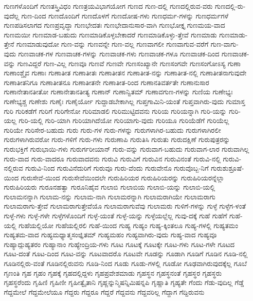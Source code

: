 {ಗುಣಗಳೊಂದಿಗೆ
ಗುಣತಸ್ತ್ರಿವಿಧಂ
ಗುಣತ್ರಯವಿಭಾಗಯೋಗ
ಗುಣದ
ಗುಣ-ದಲ್ಲಿ
ಗುಣದಲ್ಲಿರುವ-ವರು
ಗುಣದಲ್ಲಿ-ರು-ವುದೆಲ್ಲ
ಗುಣ-ದಿಂದ
ಗುಣದೊಂದಿಗೆ
ಗುಣದೊಳಗೆ
ಗುಣದೋಷ-ಗಳು
ಗುಣಧರ್ಮ-ಗಳನ್ನು
ಗುಣಧರ್ಮಗಳೆ
ಗುಣಪಡಿಸಲಾಗದ
ಗುಣಪ್ರವೃದ್ಧಾ
ಗುಣಭೇದತಃ
ಗುಣಭೇದಾನುಸಾರ-ವಾಗಿ
ಗುಣಭೋಕ್ತೃ
ಗುಣಮಯ-ವಾದ
ಗುಣಮಯೀ
ಗುಣಮಾಡ-ಬಹುದು
ಗುಣಮಾಡಿಕೊಳ್ಳಬೇಕಾದರೆ
ಗುಣಮಾಡಿಕೊಳ್ಳು-ತ್ತೇವೆ
ಗುಣಮಾಡು
ಗುಣಮಾಡು-ತ್ತೇನೆ
ಗುಣಮಾಡುವುದೋ
ಗುಣ-ವನ್ನು
ಗುಣವನ್ನೇ
ಗುಣ-ವಲ್ಲ
ಗುಣವಾಗಲೀ
ಗುಣವಾಗುವ-ವರೆಗೆ
ಗುಣ-ವಾಗು-ವುದು
ಗುಣವಾಚಕ-ಗಳ
ಗುಣವಾಚಕ-ಗಳನ್ನು
ಗುಣವಾಚಕ-ಗಳು
ಗುಣವಾಚಕ-ಗಳೂ
ಗುಣವಾಚಕ-ದಿಂದ
ಗುಣವಾಚಕ-ವನ್ನು
ಗುಣವಿದ್ದರೆ
ಗುಣ-ವಿಲ್ಲ
ಗುಣವೂ
ಗುಣವೆ
ಗುಣವೇ
ಗುಣಸಂಖ್ಯಾನೇ
ಗುಣಸಂಗವೇ
ಗುಣಸಂಗೋಽಸ್ಯ
ಗುಣಾ
ಗುಣಾಂಶ್ಚೈವ
ಗುಣಾಃ
ಗುಣಾತೀತ
ಗುಣಾತೀತಃ
ಗುಣಾತೀತನ
ಗುಣಾತೀತ-ನನ್ನು
ಗುಣಾತೀತ-ನಲ್ಲಿ
ಗುಣಾತೀತನಾಗುವುದೇ
ಗುಣಾತೀತನಿಗೂ
ಗುಣಾತೀತನೂ
ಗುಣಾತೀತನೇ
ಗುಣಾತೀತ-ರಿಂದ
ಗುಣಾನತಿವರ್ತತೇ
ಗುಣಾನುಸಾರ
ಗುಣಾನೇತಾನತೀತೋ
ಗುಣಾನೇತಾನತೀತ್ಯ
ಗುಣಾನ್
ಗುಣಾನ್ವಿತಮ್
ಗುಣಾವಗುಣ-ಗಳನ್ನು
ಗುಣಿಯ
ಗುಣೇಭ್ಯಃ
ಗುಣೇಭ್ಯಶ್ಚ
ಗುಣೇಶು
ಗುಣೈಃ
ಗುಣೈರ್ಯೋ
ಗುದ್ದಾಡಬೇಕಾಗಿಲ್ಲ
ಗುಪ್ತಗಾಮಿನಿ-ಯಂತೆ
ಗುಪ್ತವಾಗಿರು-ವುದು
ಗುಮಾಸ್ತ
ಗುರಿ
ಗುರಿಕಡೆಗೆ
ಗುರಿಗೆ
ಗುರಿಗೇನೋ
ಗುರಿಮಾಡಲಿ
ಗುರಿಮುಟ್ಟಿದವನು
ಗುರಿಯ
ಗುರಿಯನ್ನಾಗಿ
ಗುರಿ-ಯನ್ನು
ಗುರಿ-ಯಲ್ಲ
ಗುರಿ-ಯಲ್ಲಿ
ಗುರಿ-ಯಾಗಿ
ಗುರಿಯಾಗಿದೆಯೋ
ಗುರಿಯಾಗು-ವುದು
ಗುರಿಯೂ
ಗುರಿಯೆಡೆಗೆ
ಗುರಿಯೆಲ್ಲ
ಗುರಿಯೇ
ಗುರಿಸೇರ-ಬಹುದು
ಗುರು
ಗುರು-ಗಳ
ಗುರು-ಗಳನ್ನು
ಗುರುಗಳಾಗಿರ-ಬಹುದು
ಗುರುಗಳಾಗಿರಲೀ
ಗುರುಗಳಾಗಿರುವರೋ
ಗುರು-ಗಳಿಗೆ
ಗುರು-ಗಳು
ಗುರುಣಾಪಿ
ಗುರುತಿಸಿ
ಗುರುತು
ಗುರುದಕ್ಷಿಣೆ
ಗುರುಪುತ್ರರನ್ನು
ಗುರುಭಕ್ತಿಗೆ
ಗುರುಭಾಯಿ-ಗಳು
ಗುರುರ್ಗರೀಯಾನ್
ಗುರು-ವನ್ನು
ಗುರುವಾಗ-ಬಹುದು
ಗುರುವಾಗ-ಲಾರ
ಗುರುವಾಗಿಲ್ಲ
ಗುರು-ವಾದ
ಗುರು-ವಾದರೂ
ಗುರುವಾದವನು
ಗುರುವಿ
ಗುರುವಿಗೆ
ಗುರುವಿನ
ಗುರುವಿನಂತೆ
ಗುರುವಿ-ನಲ್ಲಿ
ಗುರುವಿ-ನಲ್ಲಿರುವ
ಗುರುವಿ-ನಿಂದ
ಗುರುವಿನೆದುರಿಗೆ
ಗುರುವೂ
ಗುರು-ವೆಂದು
ಗುರುವೇನೊ
ಗುರುವೊಬ್ಬ-ನಿಗೆ
ಗುರುಶುಶ್ರೂಷೆ-ಯಿಂದ
ಗುರುಸೇವೆ-ಯಿಂದ
ಗುರುಸೇವೆಯಿಂದಲೇ
ಗುರುಹಿರಿಯರ
ಗುರುಹಿರಿಯರನ್ನು
ಗುರುಹಿರಿಯರನ್ನೆಲ್ಲಾ
ಗುರುಹಿರಿಯರು
ಗುರೂನಹತ್ವಾ
ಗುರೂನಿಹೈವ
ಗುಲಾಬಿ
ಗುಲಾಬಿಯ
ಗುಲಾಬಿ-ಯನ್ನು
ಗುಲಾಬಿ-ಯಲ್ಲಿ
ಗುಲಾಮನನ್ನಾಗಿ
ಗುಲಾಮ-ನನ್ನು
ಗುಲಾಮ-ನಾಗಿ
ಗುಲಾಮರನ್ನಾಗಿ
ಗುಲಾಮರಾಗಿಯೇ
ಗುಲಾಮರಾಗು
ಗುಲಾಮರಾಗು-ತ್ತೇವೆ
ಗುಲಾಮರಾಗುತ್ತೇವೆಯೊ
ಗುಲಾಮರಾಗುವೆವು
ಗುಲಾಮರು
ಗುಳಿಗೆ-ಗಳನ್ನು
ಗುಳ್ಳೆ
ಗುಳ್ಳೆಗ-ಳಂತೆ
ಗುಳ್ಳೆ-ಗಳು
ಗುಳ್ಳೆ-ಗಳೇ
ಗುಳ್ಳೆಗಳೊಂದಿಗೆ
ಗುಳ್ಳೆ-ಯಂತೆ
ಗುಳ್ಳೆ-ಯನ್ನು
ಗುಳ್ಳೆಯಲ್ಲೆಲ್ಲ
ಗುವು-ದಕ್ಕೆ
ಗುಹೆ
ಗುಹೆಗೆ
ಗುಹೆ-ಯಲ್ಲಿ
ಗುಹೆಯಲ್ಲಿಯೋ
ಗುಹೆಯಲ್ಲಿರಲಿ
ಗುಹೆ-ಯಿಂದ
ಗುಹ್ಯ
ಗುಹ್ಯಂ
ಗುಹ್ಯ-ಕ್ಕಿಂತಲೂ
ಗುಹ್ಯ-ಗಳಲ್ಲಿ
ಗುಹ್ಯತಮಂ
ಗುಹ್ಯತಮ-ವಾದ
ಗುಹ್ಯಮಧ್ಯಾತ್ಮಸಂಜ್ಞಿತಮ್
ಗುಹ್ಯಮಹಂ
ಗುಹ್ಯವಾಗಿರು-ವುದು
ಗುಹ್ಯ-ವಾದ
ಗುಹ್ಯವೂ
ಗುಹ್ಯಾದ್ಗುಹ್ಯತರಂ
ಗುಹ್ಯಾನಾಂ
ಗುಹ್ಯೇಂದ್ರಿಯ-ಗಳು
ಗೂಟ
ಗೂಟಕ್ಕೆ
ಗೂಟಕ್ಕೇ
ಗೂಟ-ಗಳು
ಗೂಟ-ಗಳೇ
ಗೂಟದ
ಗೂಟ-ದಂತೆ
ಗೂಟ-ದಿಂದ
ಗೂಟ-ವನ್ನು
ಗೂಟವಾದರೊ
ಗೂಟವೇ
ಗೂಡನ್ನು
ಗೂಡಾಗಿ
ಗೂಡಿಗೆ
ಗೂಡಿನ
ಗೂಡಿ-ನಲ್ಲಿ
ಗೂಡಿನಲ್ಲಿರು-ವಂತೆ
ಗೂಡಿನಲ್ಲಿರುವನು
ಗೂಡಿ-ನಿಂದ
ಗೂಡು
ಗೂಡು-ಗಳಲ್ಲಿ
ಗೂಡೋ
ಗೂಢವಾಗಿರುವುದಕ್ಕೆಲ್ಲ
ಗೂಬೆ
ಗೃಣಂತಿ
ಗೃಹ
ಗೃಹಂ
ಗೃಹಕ್ಕೆ
ಗೃಹದಲ್ಲಿದ್ದಳು
ಗೃಹಪ್ರವೇಶಮಾಡು
ಗೃಹಸ್ಥನ
ಗೃಹಸ್ಥನಂತೆ
ಗೃಹಸ್ಥರ
ಗೃಹಸ್ಥರು
ಗೃಹಸ್ಥರೆಂದು
ಗೃಹಿಣಿ
ಗೃಹಿಣೀ
ಗೃಹೀತ್ವೈತಾನಿ
ಗೃಹ್ಣನ್ನುನ್ಮಿಷನ್ನಿಮಿಷನ್ನಪಿ
ಗೃಹ್ಣಾತಿ
ಗೃಹ್ಯತೇ
ಗೆಂದು
ಗೆಡು-ವುದಿಲ್ಲ
ಗೆಡ್ಡೆ
ಗೆದ್ದಮೇಲೆ
ಗೆದ್ದಮೇಲೆಯೂ
ಗೆದ್ದರು
ಗೆದ್ದರೂ
ಗೆದ್ದರೆ
ಗೆದ್ದವನು
ಗೆದ್ದವರಿಲ್ಲ
ಗೆದ್ದಾಗ
ಗೆದ್ದಿರುವನು
}
